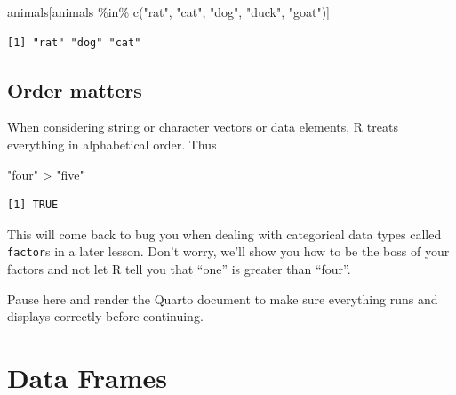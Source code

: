\documentclass[
  letterpaper,
  DIV=11,
  numbers=noendperiod,
  oneside]{scrreprt}
\newenvironment{Shaded}{\begin{snugshade}}{\end{snugshade}}
\newcommand{\FunctionTok}[1]{\textcolor[rgb]{0.28,0.35,0.67}{#1}}
\newcommand{\NormalTok}[1]{\textcolor[rgb]{0.00,0.23,0.31}{#1}}
\newcommand{\SpecialCharTok}[1]{\textcolor[rgb]{0.37,0.37,0.37}{#1}}
\newcommand{\StringTok}[1]{\textcolor[rgb]{0.13,0.47,0.30}{#1}}
\begin{document}
\begin{Shaded}
\begin{Highlighting}[]
\NormalTok{animals[animals }\SpecialCharTok{\%in\%} \FunctionTok{c}\NormalTok{(}\StringTok{"rat"}\NormalTok{, }\StringTok{"cat"}\NormalTok{, }\StringTok{"dog"}\NormalTok{, }\StringTok{"duck"}\NormalTok{, }\StringTok{"goat"}\NormalTok{)]}
\end{Highlighting}
\end{Shaded}

\begin{verbatim}
[1] "rat" "dog" "cat"
\end{verbatim}

\subsection{Order matters}\label{order-matters}

When considering string or character vectors or data elements, R treats
everything in alphabetical order. Thus

\begin{Shaded}
\begin{Highlighting}[]
\StringTok{"four"} \SpecialCharTok{\textgreater{}} \StringTok{"five"}
\end{Highlighting}
\end{Shaded}

\begin{verbatim}
[1] TRUE
\end{verbatim}

This will come back to bug you when dealing with categorical data types
called \texttt{factor}s in a later lesson. Don't worry, we'll show you
how to be the boss of your factors and not let R tell you that ``one''
is greater than ``four''.

\begin{tcolorbox}[enhanced jigsaw, bottomrule=.15mm, colback=white, colframe=quarto-callout-tip-color-frame, toprule=.15mm, coltitle=black, rightrule=.15mm, opacitybacktitle=0.6, colbacktitle=quarto-callout-tip-color!10!white, toptitle=1mm, leftrule=.75mm, breakable, bottomtitle=1mm, titlerule=0mm, title={👉 Render your document}, arc=.35mm, left=2mm, opacityback=0]

Pause here and render the Quarto document to make sure everything runs
and displays correctly before continuing.

\end{tcolorbox}

\section{Data Frames}\label{data-frames}
\end{document}
